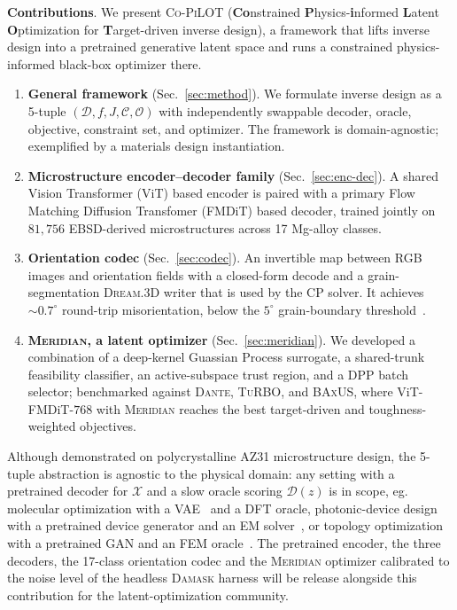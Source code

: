 \documentclass{article}
\newcommand{\Co}{\textsc{Co-PiLOT}}
\newcommand{\meridian}{\textsc{Meridian}}
\newcommand{\dante}{\textsc{Dante}}
\newcommand{\turbo}{\textsc{TuRBO}}
\newcommand{\baxus}{\textsc{BAxUS}}
\newcommand{\damask}{\textsc{Damask}}
\newcommand{\dreamthreed}{\textsc{Dream.3D}}
\newcommand{\X}{\mathcal{X}}
\newcommand{\Dec}{\mathcal{D}}
\newcommand{\Opt}{\mathcal{O}}
\begin{document}
\textbf{Contributions}. We present \Co{} (\textbf{Co}nstrained \textbf{P}hysics-\textbf{i}nformed \textbf{L}atent \textbf{O}ptimization for \textbf{T}arget-driven inverse design), a framework that lifts inverse design into a pretrained generative latent space and runs a constrained physics-informed black-box optimizer there.
\begin{enumerate}[leftmargin=1.2em,itemsep=-2pt,topsep=2pt]
  \item \textbf{General framework} (Sec.~\ref{sec:method}). We formulate inverse design as a 5-tuple $(\Dec, f, J, \mathcal{C}, \Opt)$ with independently swappable decoder, oracle, objective, constraint set, and optimizer. The framework is domain-agnostic; exemplified by a materials design instantiation.
    \item \textbf{Microstructure encoder--decoder family} (Sec.~\ref{sec:enc-dec}). A shared Vision Transformer (ViT) based encoder is paired with a primary Flow Matching Diffusion Transfomer (FMDiT) based decoder, trained jointly on $81{,}756$ EBSD-derived microstructures across 17 Mg-alloy classes.
    \item \textbf{Orientation codec} (Sec.~\ref{sec:codec}). An invertible map between RGB images and orientation fields with a closed-form decode and a grain-segmentation \dreamthreed{} writer that is used by the CP solver. It achieves ${\sim}0.7^\circ$ round-trip misorientation, below the $5^\circ$ grain-boundary threshold~\citep{readshockley1950, groeber2014}.
    \item \textbf{\meridian{}, a latent optimizer} (Sec.~\ref{sec:meridian}). We developed a combination of a deep-kernel Guassian Process surrogate, a shared-trunk feasibility classifier, an active-subspace trust region, and a DPP batch selector; benchmarked against \dante{}, \turbo{}, and \baxus{}, where ViT-FMDiT-$768$ with \meridian{} reaches the best target-driven and toughness-weighted objectives.
\end{enumerate}

Although demonstrated on polycrystalline AZ31 microstructure design, the 5-tuple abstraction is agnostic to the physical domain: any setting with a pretrained decoder for $\X$ and a slow oracle scoring $\Dec(z)$ is in scope, eg. molecular optimization with a VAE~\citep{gomez2018} and a DFT oracle, photonic-device design with a pretrained device generator and an EM solver~\citep{Yeung2023}, or topology optimization with a pretrained GAN and an FEM oracle~\citep{nie2020}. The pretrained encoder, the three decoders, the 17-class orientation codec and the \meridian{} optimizer calibrated to the noise level of the headless \damask{} harness will be release alongside this contribution for the latent-optimization community.
\end{document}
